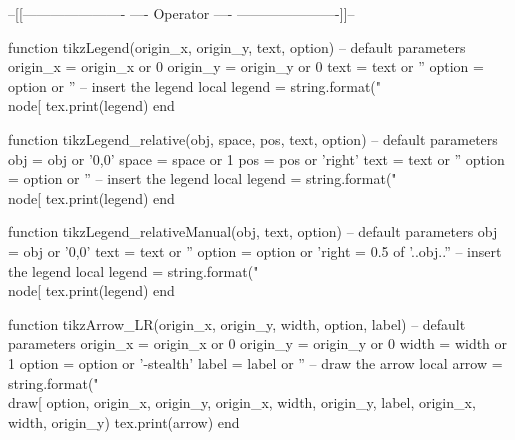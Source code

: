 \usepackage[backend=biber, bibstyle=numeric, sorting=none]{biblatex}
\usepackage{tikz}
\usetikzlibrary{math}
\usetikzlibrary{calc}
\usetikzlibrary{fit}
\usetikzlibrary{positioning} %
\usetikzlibrary{decorations.pathreplacing}
\usetikzlibrary{decorations.shapes}
\usetikzlibrary{shapes.geometric}
\usetikzlibrary{arrows}
\usepackage{luacode}

\begin{luacode*}

	--[[----------------------
	----     Operator     ----
	----------------------]]--
  
	function tikzLegend(origin_x, origin_y, text, option)
	  -- default parameters
	  origin_x = origin_x or 0
	  origin_y = origin_y or 0
	  text = text or ''
	  option = option or ''
	  -- insert the legend
	  local legend = string.format("\\node[%
	  tex.print(legend)
	end
  
	function tikzLegend_relative(obj, space, pos, text, option)
	  -- default parameters
	  obj = obj or '0,0'
	  space = space or 1
	  pos = pos or 'right'
	  text = text or ''
	  option = option or ''
	  -- insert the legend
	  local legend = string.format("\\node[%
	  tex.print(legend)
	end
  
	function tikzLegend_relativeManual(obj, text, option)
	  -- default parameters
	  obj = obj or '0,0'
	  text = text or ''
	  option = option or 'right = 0.5 of '..obj..''
	  -- insert the legend
	  local legend = string.format("\\node[%
	  tex.print(legend)
	end
  
  
	function tikzArrow_LR(origin_x, origin_y, width, option, label)
	-- default parameters
	  origin_x = origin_x or 0
	  origin_y = origin_y or 0
	  width = width or 1
	  option = option or '-stealth'
	  label = label or ''
	  -- draw the arrow
	  local arrow = string.format("\\draw[%
	  option, origin_x, origin_y, origin_x, width, origin_y, label, origin_x, width, origin_y)
	  tex.print(arrow)
	end
  

\end{luacode*}
